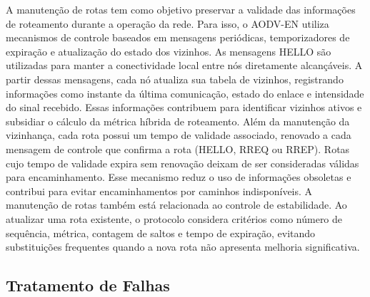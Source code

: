 A manutenção de rotas tem como objetivo preservar a validade das
informações de roteamento durante a operação da rede. Para isso, o
AODV-EN utiliza mecanismos de controle baseados em mensagens periódicas,
temporizadores de expiração e atualização do estado dos vizinhos. As
mensagens HELLO são utilizadas para manter a conectividade local entre
nós diretamente alcançáveis. A partir dessas mensagens, cada nó atualiza
sua tabela de vizinhos, registrando informações como instante da última
comunicação, estado do enlace e intensidade do sinal recebido. Essas
informações contribuem para identificar vizinhos ativos e subsidiar o
cálculo da métrica híbrida de roteamento. Além da manutenção da
vizinhança, cada rota possui um tempo de validade associado, renovado a
cada mensagem de controle que confirma a rota (HELLO, RREQ ou RREP).
Rotas cujo tempo de validade expira sem renovação deixam de ser
consideradas válidas para encaminhamento. Esse mecanismo reduz o uso de
informações obsoletas e contribui para evitar encaminhamentos por
caminhos indisponíveis. A manutenção de rotas também está relacionada ao
controle de estabilidade. Ao atualizar uma rota existente, o protocolo
considera critérios como número de sequência, métrica, contagem de
saltos e tempo de expiração, evitando substituições frequentes quando a
nova rota não apresenta melhoria significativa.

\subsection{Tratamento de Falhas}\label{tratamento-de-falhas}

